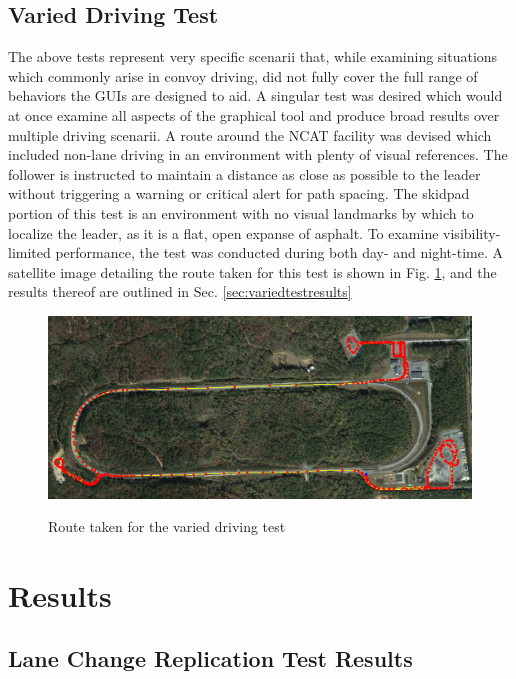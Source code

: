 \documentclass[12pt]{report}
\begin{document}
\subsection{Varied Driving Test} \label{sec:variedtest}
The above tests represent very specific scenarii that, while examining situations which commonly arise in convoy driving, did not fully cover the full range of behaviors the GUIs are designed to aid.  A singular test was desired which would at once examine all aspects of the graphical tool and produce broad results over multiple driving scenarii. A route around the NCAT facility was devised which included non-lane driving in an environment with plenty of visual references. 
The follower is instructed to maintain a distance as close as possible to the leader without triggering a warning or critical alert for path spacing.
The skidpad portion of this test is an environment with no visual landmarks by which to localize the leader, as it is a flat, open expanse of asphalt.
To examine visibility-limited performance, the test was conducted during both day- and night-time. A satellite image detailing the route taken for this test is shown in Fig. \ref{fig:variedtestroute}, and the results thereof are outlined in Sec. \ref{sec:variedtestresults}

\begin{figure}[ht] \centering \label{fig:variedtestroute}
    \includegraphics[width=5in]{./figs/varied_test_route.png}
    \caption{Route taken for the varied driving test}
\end{figure}


\section{Results} \label{sec:results}


\subsection{Lane Change Replication Test Results} \label{sec:lanechangetestresults}
\end{document}
